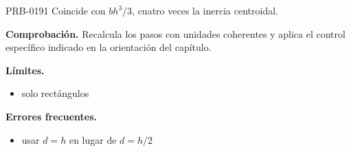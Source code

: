 \begin{studiumworked}{PRB-0191}
Coincide con $bh^3/3$, cuatro veces la inercia centroidal.

\par\textbf{Comprobación.} Recalcula los pasos con unidades coherentes y aplica el control específico indicado en la orientación del capítulo.

\textbf{Límites.}\begin{itemize}\item solo rectángulos\end{itemize}

\textbf{Errores frecuentes.}\begin{itemize}\item usar $d = h$ en lugar de $d = h/2$\end{itemize}

\end{studiumworked}

\Needspace{.3\textheight}

